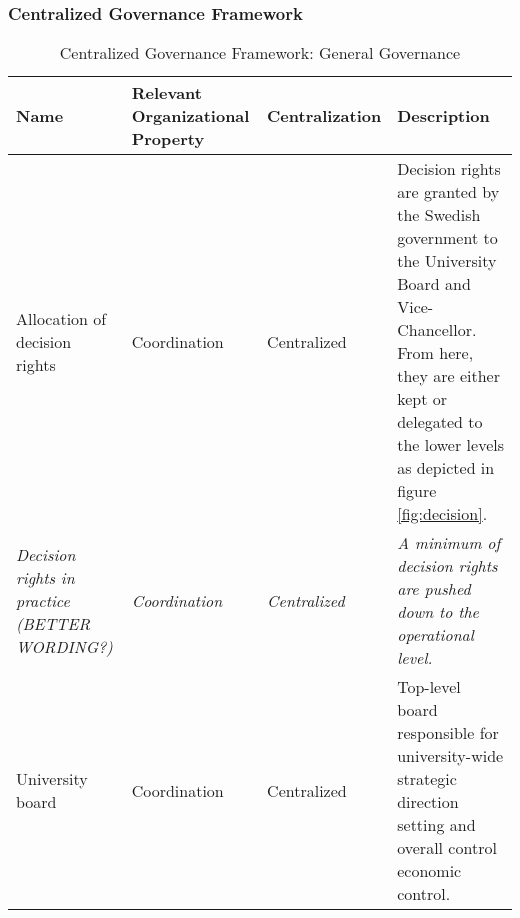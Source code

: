
\subsubsection{Centralized Governance Framework}


\begin{table}
\caption{Centralized Governance Framework: General Governance}
\label{table:centralGeneralGovernance}
\begin{tabular}{ | p{} | p{}| p{} | p{}|}
%
\hline
%
\textbf{Name} & 
\textbf{Relevant Organizational Property} &
\textbf{Centralization} &  
\textbf{Description} \\
%
\hline
%
 Allocation of decision rights & 
 Coordination &
 Centralized & 
 Decision rights are granted by the Swedish government to the University Board and Vice-Chancellor. From here, they are either kept or delegated to the lower levels as depicted in figure \ref{fig:decision}. \\
%
\hline
%
 \textit{Decision rights in practice (BETTER WORDING?)} & 
 \textit{Coordination} &
 \textit{Centralized} & 
 \textit{A minimum of decision rights are pushed down to the operational level.} \\
%
\hline
%
%
%
 University board &
 Coordination &
 Centralized &
 Top-level board responsible for university-wide strategic direction setting and overall control economic control. \\
%
\hline
%
 

\end{tabular}
\end{table}
